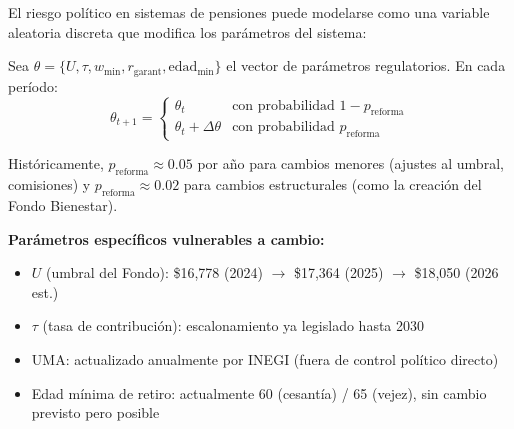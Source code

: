\documentclass[11pt,a4paper]{report}
\begin{document}
\begin{tcolorbox}[colback=blue!5!white, colframe=blue!75!black, title=\textbf{Definici\'on Formal: Incertidumbre Regulatoria en Pensiones}]
El riesgo pol\'itico en sistemas de pensiones puede modelarse como una variable aleatoria discreta que modifica los par\'ametros del sistema:

Sea $\theta = \{U, \tau, w_{\min}, r_{\text{garant}}, \text{edad}_{\min}\}$ el vector de par\'ametros regulatorios. En cada per\'iodo:
\[
  \theta_{t+1} = \begin{cases}
    \theta_t & \text{con probabilidad } 1 - p_{\text{reforma}} \\
    \theta_t + \Delta\theta & \text{con probabilidad } p_{\text{reforma}}
  \end{cases}
\]

Hist\'oricamente, $p_{\text{reforma}} \approx 0.05$ por a\~no para cambios menores (ajustes al umbral, comisiones) y $p_{\text{reforma}} \approx 0.02$ para cambios estructurales (como la creaci\'on del Fondo Bienestar).

\textbf{Par\'ametros espec\'ificos vulnerables a cambio:}
\begin{itemize}
  \item $U$ (umbral del Fondo): \$16,778 (2024) $\to$ \$17,364 (2025) $\to$ \$18,050 (2026 est.)
  \item $\tau$ (tasa de contribuci\'on): escalonamiento ya legislado hasta 2030
  \item UMA: actualizado anualmente por INEGI (fuera de control pol\'itico directo)
  \item Edad m\'inima de retiro: actualmente 60 (cesant\'ia) / 65 (vejez), sin cambio previsto pero posible
\end{itemize}
\end{tcolorbox}
\end{document}
